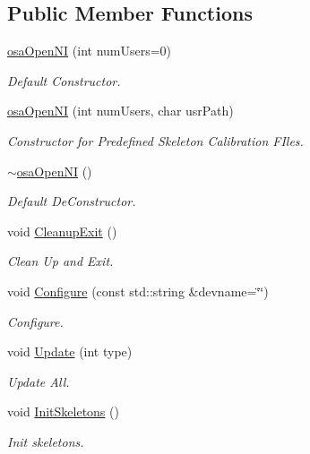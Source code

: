 \subsection*{Public Member Functions}
\begin{DoxyCompactItemize}
\item 
\hyperlink{classosa_open_n_i_aa84fdbe2c499a1a00ae275052f8bd9f7}{osa\-Open\-N\-I} (int num\-Users=0)
\begin{DoxyCompactList}\small\item\em Default Constructor. \end{DoxyCompactList}\item 
\hyperlink{classosa_open_n_i_a3194471e7876fa2e9d47d646e9a6a596}{osa\-Open\-N\-I} (int num\-Users, char usr\-Path)
\begin{DoxyCompactList}\small\item\em Constructor for Predefined Skeleton Calibration F\-Iles. \end{DoxyCompactList}\item 
\hyperlink{classosa_open_n_i_ab8cea3bc689522cff98db4e6c0f780a8}{$\sim$osa\-Open\-N\-I} ()
\begin{DoxyCompactList}\small\item\em Default De\-Constructor. \end{DoxyCompactList}\item 
void \hyperlink{classosa_open_n_i_a2bf147bee34f5712746526b01a6cae6f}{Cleanup\-Exit} ()
\begin{DoxyCompactList}\small\item\em Clean Up and Exit. \end{DoxyCompactList}\item 
void \hyperlink{classosa_open_n_i_a7b9ebb7dd8d0589898516cc000b20a1a}{Configure} (const std\-::string \&devname=\char`\"{}\char`\"{})
\begin{DoxyCompactList}\small\item\em Configure. \end{DoxyCompactList}\item 
void \hyperlink{classosa_open_n_i_adfdd55a8a6c0057a1e10d7878ed5a17d}{Update} (int type)
\begin{DoxyCompactList}\small\item\em Update All. \end{DoxyCompactList}\item 
void \hyperlink{classosa_open_n_i_a976b65514f34dc257445a6358b03ac37}{Init\-Skeletons} ()
\begin{DoxyCompactList}\small\item\em Init skeletons. \end{DoxyCompactList}\item 

\end{DoxyCompactItemize}
